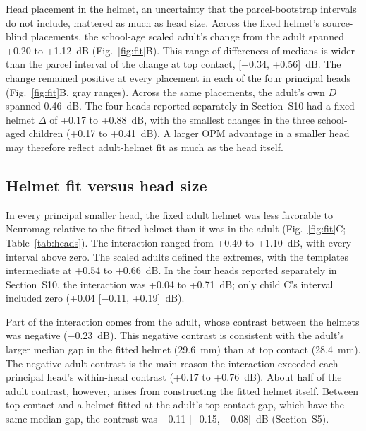\documentclass[preprint,12pt,authoryear,a4paper]{elsarticle}
\begin{document}
Head placement in the helmet, an uncertainty that the parcel-bootstrap intervals do not include, mattered as much as head size. Across the fixed helmet's source-blind placements, the school-age scaled adult's change from the adult spanned +0.20 to +1.12~dB (Fig.~\ref{fig:fit}B). This range of differences of medians is wider than the parcel interval of the change at top contact, [+0.34, +0.56]~dB. The change remained positive at every placement in each of the four principal heads (Fig.~\ref{fig:fit}B, gray ranges). Across the same placements, the adult's own $D$ spanned 0.46~dB. The four heads reported separately in Section~S10 had a fixed-helmet $\Delta$ of +0.17 to +0.88~dB, with the smallest changes in the three school-aged children (+0.17 to +0.41~dB). A larger OPM advantage in a smaller head may therefore reflect adult-helmet fit as much as the head itself.

\subsection{Helmet fit versus head size}\label{sec:res-fit}

In every principal smaller head, the fixed adult helmet was less favorable to Neuromag relative to the fitted helmet than it was in the adult (Fig.~\ref{fig:fit}C; Table~\ref{tab:heads}). The interaction ranged from +0.40 to +1.10~dB, with every interval above zero. The scaled adults defined the extremes, with the templates intermediate at +0.54 to +0.66~dB. In the four heads reported separately in Section~S10, the interaction was +0.04 to +0.71~dB; only child C's interval included zero (+0.04 [−0.11, +0.19]~dB).

Part of the interaction comes from the adult, whose contrast between the helmets was negative (−0.23~dB). This negative contrast is consistent with the adult's larger median gap in the fitted helmet (29.6~mm) than at top contact (28.4~mm). The negative adult contrast is the main reason the interaction exceeded each principal head's within-head contrast (+0.17 to +0.76~dB). About half of the adult contrast, however, arises from constructing the fitted helmet itself. Between top contact and a helmet fitted at the adult's top-contact gap, which have the same median gap, the contrast was −0.11 [−0.15, −0.08]~dB (Section~S5).
\end{document}
